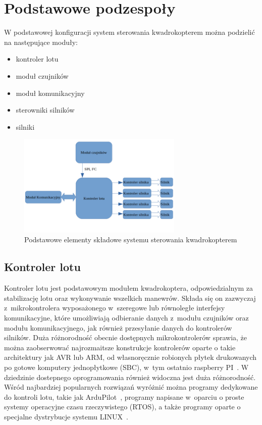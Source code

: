 \documentclass[11pt, twoside]{Thesis} %
\begin{document}
\section{Podstawowe podzespoły}

W podstawowej konfiguracji system sterowania kwadrokopterem można podzielić na następujące moduły:
\begin{itemize}
	\item{kontroler lotu}
	\item{moduł czujników}
	\item{moduł komunikacyjny}
	\item{sterowniki silników}
	\item{silniki}
\end{itemize}

\begin{figure}[H]
	\centering
		\includegraphics[width=0.7\textwidth]{Pictures/quadrotor_modules.png}
	\caption[Podstawowe moduły kwawdrokoptera]{Podstawowe elementy składowe systemu sterowania kwadrokopterem}
	\label{fig:quadrotor_modules.png}
\end{figure}

\subsection{Kontroler lotu}

Kontroler lotu jest podstawowym modułem kwadrokoptera, odpowiedzialnym za stabilizację lotu oraz wykonywanie wszelkich manewrów. Składa się on zazwyczaj z~mikrokontrolera wyposażonego w~szeregowe lub równoległe interfejsy komunikacyjne, które umożliwiają odbieranie danych z~modułu czujników oraz modułu komunikacyjnego, jak również przesyłanie danych do kontrolerów silników. Duża różnorodność obecnie dostępnych mikrokontrolerów sprawia, że można zaobserwować najrozmaitsze konstrukcje kontrolerów oparte o takie architektury jak AVR lub ARM, od własnoręcznie robionych płytek drukowanych po gotowe komputery jednopłytkowe (SBC), w~tym ostatnio raspberry PI~\cite{quadro12, quadro13}. W dziedzinie dostepnego oprogramowania również widoczna jest duża różnorodność. Wśród najbardziej popularnych rozwiązań wyróżnić można programy dedykowane do kontroli lotu, takie jak ArduPilot~\cite{quadro14}, programy napisane w~oparciu o proste systemy operacyjne czasu rzeczywistego (RTOS), a także programy oparte o specjalne dystrybucje systemu LINUX~\cite{quadro15}.
\end{document}
